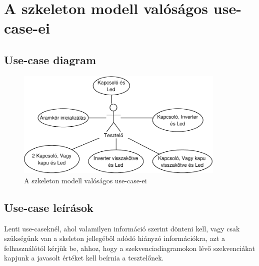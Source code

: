 \section{A szkeleton modell valóságos use-case-ei}

\subsection{Use-case diagram}

\begin{figure}[h]
\begin{center}
\includegraphics[width=10cm]{chapters/chapter05/imgs/usecase.pdf}
\caption{A szkeleton modell valóságos use-case-ei}
\label{fig:SzkeletonUseCase}
\end{center}
\end{figure}

\subsection{Use-case leírások}

Lenti use-caseknél, ahol valamilyen információ szerint dönteni kell, vagy csak szükségünk van a skeleton jellegéből adódó hiányzó információkra, azt a felhasználótól kérjük be, ahhoz, hogy a szekvenciadiagramokon lévő szekvenciákat kapjunk a javasolt értéket kell beírnia a tesztelőnek.

